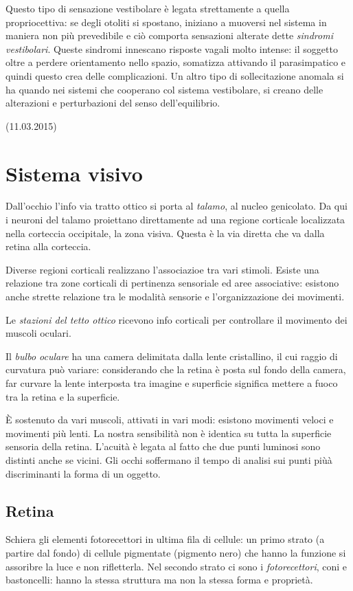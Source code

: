 \documentclass[a4paper,12pt]{article}
\begin{document}
Questo tipo di sensazione vestibolare è legata strettamente a quella propriocettiva: se degli otoliti si spostano, iniziano a muoversi nel sistema in maniera non più prevedibile e ciò comporta sensazioni alterate dette \emph{sindromi vestibolari}. Queste sindromi innescano risposte vagali molto intense: il soggetto oltre a perdere orientamento nello spazio, somatizza attivando il parasimpatico e quindi questo crea delle complicazioni. Un altro tipo di sollecitazione anomala si ha quando nei sistemi che cooperano col sistema vestibolare, si creano delle alterazioni e perturbazioni del senso dell'equilibrio. 	

(11.03.2015)

\section{Sistema visivo}
Dall'occhio l'info via tratto ottico si porta al \emph{talamo}, al nucleo genicolato. Da qui i neuroni del talamo proiettano direttamente ad una regione corticale localizzata nella corteccia occipitale, la zona visiva. Questa è la via diretta che va dalla retina alla corteccia.

Diverse regioni corticali realizzano l'associazioe tra vari stimoli. Esiste una relazione tra zone corticali di pertinenza sensoriale ed aree associative: esistono anche strette relazione tra le modalità sensorie e l'organizzazione dei movimenti.

Le \emph{stazioni del tetto ottico} ricevono info corticali per controllare il movimento dei muscoli oculari.

Il \emph{bulbo oculare} ha una camera delimitata dalla lente cristallino, il cui raggio di curvatura può variare: considerando che la retina è posta sul fondo della camera, far curvare la lente interposta tra imagine e superficie significa mettere a fuoco tra la retina e la superficie.

È sostenuto da vari muscoli, attivati in vari modi: esistono movimenti veloci e movimenti più lenti. La nostra sensibilità non è identica su tutta la superficie sensoria della retina. L'acuità è legata al fatto che due punti luminosi sono distinti anche se vicini. Gli occhi soffermano il tempo di analisi sui punti piùà discriminanti la forma di un oggetto.

\subsection{Retina}
Schiera gli elementi fotorecettori in ultima fila di cellule: un primo strato (a partire dal fondo) di cellule pigmentate (pigmento nero) che hanno la funzione si assoribre la luce e non rifletterla. Nel secondo strato ci sono i \emph{fotorecettori}, coni e bastoncelli: hanno la stessa struttura ma non la stessa forma e proprietà. 
\end{document}
